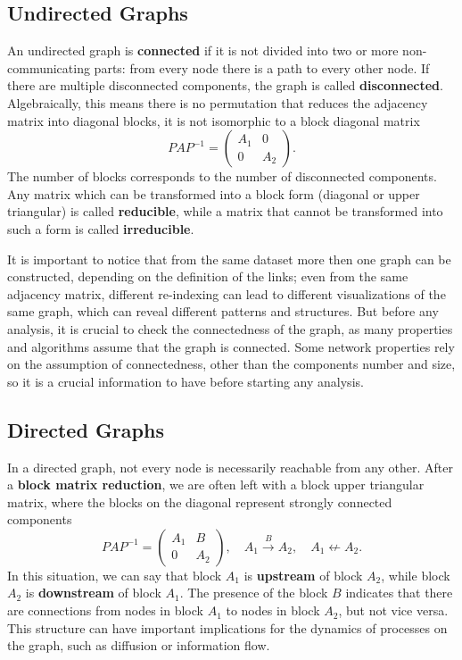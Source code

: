 \subsection{Undirected Graphs}
An undirected graph is \textbf{connected} if it is not divided into two or more non-communicating parts: from every node there is a path to every other node. If there are multiple disconnected components, the graph is called \textbf{disconnected}.
Algebraically, this means there is no permutation that reduces the adjacency matrix into diagonal blocks, it is not isomorphic to a block diagonal matrix
\[
    P A P^{-1} = \begin{pmatrix}
        A_1 & 0   \\
        0   & A_2
    \end{pmatrix}.
\]
The number of blocks corresponds to the number of disconnected components. Any matrix which can be transformed into a block form (diagonal or upper triangular) is called \textbf{reducible}, while a matrix that cannot be transformed into such a form is called \textbf{irreducible}.

It is important to notice that from the same dataset more then one graph can be constructed, depending on the definition of the links; even from the same adjacency matrix, different re-indexing can lead to different visualizations of the same graph, which can reveal different patterns and structures. But before any analysis, it is crucial to check the connectedness of the graph, as many properties and algorithms assume that the graph is connected. Some network properties rely on the assumption of connectedness, other than the components number and size, so it is a crucial information to have before starting any analysis.

\subsection{Directed Graphs}

In a directed graph, not every node is necessarily reachable from any other. After a \textbf{block matrix reduction}, we are often left with a block upper triangular matrix, where the blocks on the diagonal represent strongly connected components
\[
    P A P^{-1} = \begin{pmatrix}
        A_1 & B   \\
        0   & A_2
    \end{pmatrix}, \quad A_1 \xrightarrow{B} A_2, \quad A_1 \nleftarrow A_2.
\]
In this situation, we can say that block $A_1$ is \textbf{upstream} of block $A_2$, while block $A_2$ is \textbf{downstream} of block $A_1$. The presence of the block $B$ indicates that there are connections from nodes in block $A_1$ to nodes in block $A_2$, but not vice versa. This structure can have important implications for the dynamics of processes on the graph, such as diffusion or information flow.

